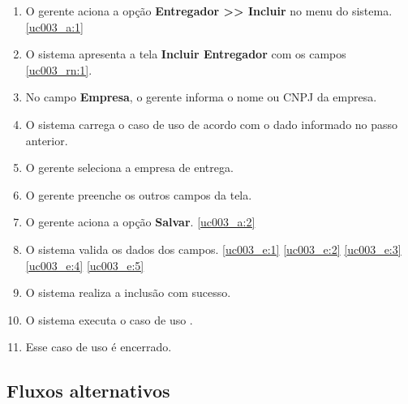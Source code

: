 \begin{enumerate}[label=P\arabic*]
	\item O gerente aciona a opção \textbf{Entregador >> Incluir} no menu do sistema. \label{uc003_p:1}\ref{uc003_a:1}
	\item O sistema apresenta a tela \textbf{Incluir Entregador} com os campos \ref{uc003_rn:1}.
	\item No campo \textbf{Empresa}, o gerente informa o nome ou CNPJ da empresa. \label{uc003_p:3}
	\item O sistema carrega o caso de uso  de acordo com o dado informado no passo anterior.
	\item O gerente seleciona a empresa de entrega. \label{uc003_p:5}
	\item O gerente preenche os outros campos da tela. \label{uc003_p:6}	
	\item O gerente aciona a opção \textbf{Salvar}. \label{uc003_p:7}\ref{uc003_a:2}
	\item O sistema valida os dados dos campos. \ref{uc003_e:1} \ref{uc003_e:2} \ref{uc003_e:3} \ref{uc003_e:4} \ref{uc003_e:5}
	\item O sistema realiza a inclusão com sucesso.
	\item O sistema executa o caso de uso .
	\item Esse caso de uso é encerrado.	
\end{enumerate}

\subsection{Fluxos alternativos}

